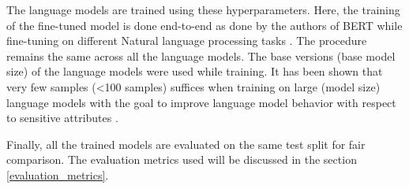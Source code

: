 \begin{table}[h!]
\caption{Hyperparameter search results for language models}
\label{tab:search_results}
\end{table}

The language models are trained using these hyperparameters. Here, the training of the fine-tuned model is done end-to-end as done by the authors of BERT while fine-tuning on different Natural language processing tasks \cite{devlin2018bert}. The procedure remains the same across all the language models. The base versions (base model size) of the language models were used while training. It has been shown that very few samples (<100 samples) suffices when training on large (model size) language models with the goal to improve language model behavior with respect to sensitive attributes \cite{solaiman2021process}. 

Finally, all the trained models are evaluated on the same test split for fair comparison. The evaluation metrics used will be discussed in the section 
\ref{evaluation_metrics}.



